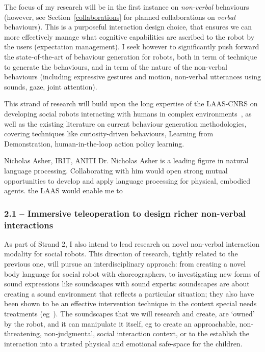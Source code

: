 The focus of my research will be in the first instance on \emph{non-verbal}
behaviours (however, see Section~\ref{collaborations} for planned collaborations
on \emph{verbal} behaviours). This is a purposeful interaction design choice,
that ensures we can more effectively manage what cognitive capabilities are
ascribed to the robot by the users (expectation management).  I seek however to
significantly push forward the state-of-the-art of behaviour generation for
robots, both in term of technique to generate the behaviours, and in term of the
nature of the non-verbal behaviours (including expressive gestures and motion,
non-verbal utterances using sounds, gaze, joint attention).

This strand of research will build upon the long expertise of the LAAS-CNRS on
developing social robots interacting with humans in complex
environments~\cite{Lallement2014,gharbi2013natural,
waldhart2015planning}, as well as the
existing literature on current behaviour generation methodologies, covering
techniques like curiosity-driven behaviours\parencite{oudeyer2005playground},
Learning from Demonstration\parencite{billard2008robot, argall2009survey},
human-in-the-loop action policy learning\parencite{senft2016sparc,
senft2019teaching}.

\begin{collaboration}{Nicholas Asher, IRIT, ANITI}
Dr. Nicholas Asher is a leading figure in natural language processing.
Collaborating with him would open strong mutual opportunities to develop and
apply language processing for physical, embodied agents.
the LAAS would enable me to 
\end{collaboration}


\subsubsection{2.1 -- Immersive teleoperation to design richer non-verbal
interactions}


As part of Strand 2, I also intend to lead research on novel non-verbal
interaction modality for social robots. This direction of research, tightly
related to the previous one, will pursue an interdisciplinary approach: from
creating a novel body language for social robot with choreographers, to
investigating new forms of sound expressions like soundscapes with sound
experts: soundscapes are about creating a sound environment that reflects a
particular situation; they also have been shown to be an effective intervention
technique in the context special needs treatments
(eg~\parencite{greher2010soundscape}). The soundscapes that we will research and
create, are `owned' by the robot, and it can manipulate it itself, eg to create
an approachable, non-threatening, non-judgmental, social interaction context, or
to the establish the interaction into a trusted physical and emotional
safe-space for the children.

